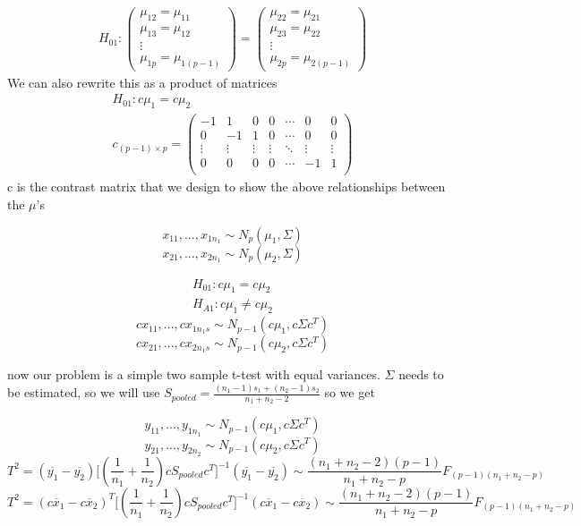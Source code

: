 \begin{gather*}
    H_{01} : \begin{pmatrix}
    \mu_{12}=\mu_{11}\\
    \mu_{13}=\mu_{12}\\
    \vdots \\
    \mu_{1p}=\mu_{1(p-1)}
    \end{pmatrix}=
    \begin{pmatrix}
    \mu_{22}=\mu_{21}\\
    \mu_{23}=\mu_{22}\\
    \vdots \\
    \mu_{2p}=\mu_{2(p-1)}
    \end{pmatrix}
\end{gather*}
We can also rewrite this as a product of matrices
\begin{gather*}
H_{01}: c\mu_1 = c\mu_2 \\
c_{(p-1)\times p} = \begin{pmatrix}
-1 & 1 & 0 & 0 & \cdots & 0 & 0 \\
0 & -1 & 1 & 0 & \cdots & 0 & 0 \\
\vdots & \vdots & \vdots & \vdots & \ddots &\vdots & \vdots \\
0 & 0 & 0 & 0 & \cdots & -1 & 1 \\
\end{pmatrix}
\end{gather*}
c is the contrast matrix that we design  to show the above relationships between the $\mu$'s

\[x_{11},...,x_{1n_1}\sim N_p(\mu_1,\Sigma)\]
\[x_{21},...,x_{2n_1}\sim N_p(\mu_2,\Sigma)\]

\begin{gather*}
    H_{01}: c\mu_1 = c\mu_2 \\
    H_{A1}: c\mu_1 \neq c\mu_2
\end{gather*}
\[cx_{11},...,cx_{1n_1s}\sim N_{p-1}(c\mu_1,c\Sigma c^T)\]
\[cx_{21},...,cx_{2n_1s}\sim N_{p-1}(c\mu_2,c\Sigma c^T)\]

now our problem is a simple two sample t-test with equal variances.
$\Sigma$ needs to be estimated, so we will use $S_{pooled} = \frac{(n_1-1)s_1 + (n_2-1)s_2}{n_1+n_2-2}$ so we get

\[y_{11},...,y_{1n_1}\sim N_{p-1}(c\mu_1,c\Sigma c^T)\]
\[y_{21},...,y_{2n_2}\sim N_{p-1}(c\mu_2,c\Sigma c^T)\]
\[T^2 = (\overline{y_1}-\overline{y_2})\Big[(\frac{1}{n_1}+\frac{1}{n_2}) c S_{pooled}c^T
\Big]^{-1} (\overline{y_1}-\overline{y_2})\sim \frac{(n_1+n_2-2)(p-1)}{n_1+n_2-p}F_{(p-1)(n_1+n_2-p)}\]
\[T^2 = (c\overline{x}_1-c\overline{x}_2)^T\Big[(\frac{1}{n_1}+\frac{1}{n_2}) c S_{pooled}c^T
\Big]^{-1} (c\overline{x}_1-c\overline{x}_2)\sim \frac{(n_1+n_2-2)(p-1)}{n_1+n_2-p}F_{(p-1)(n_1+n_2-p)}\]

